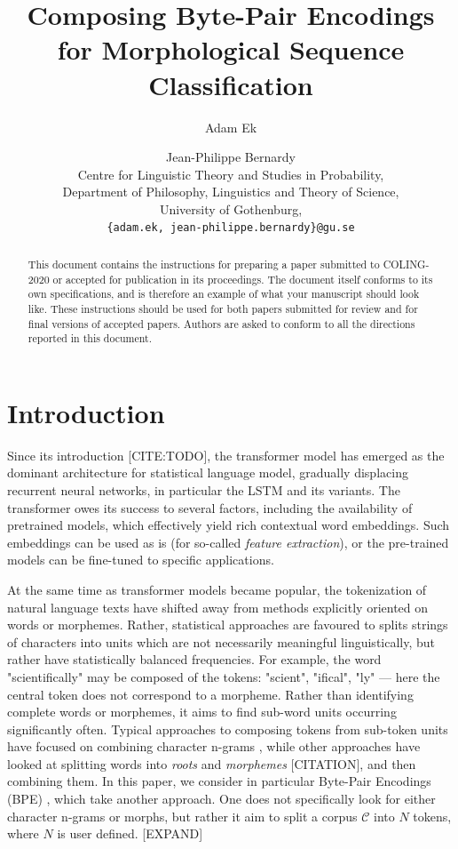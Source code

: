 \documentclass[11pt]{article}
\title{Composing Byte-Pair Encodings for Morphological Sequence Classification}
\author{Adam Ek \and Jean-Philippe Bernardy\\
	Centre for Linguistic Theory and Studies in Probability,\\
	Department of Philosophy, Linguistics and Theory of Science,\\
	University of Gothenburg,\\
	\texttt{\{adam.ek, jean-philippe.bernardy\}@gu.se}}
\date{}
\begin{document}
	\maketitle
	
	\begin{abstract}
		This document contains the instructions for preparing a paper submitted
		to COLING-2020 or accepted for publication in its proceedings. The document itself
		conforms to its own specifications, and is therefore an example of
		what your manuscript should look like. These instructions should be
		used for both papers submitted for review and for final versions of
		accepted papers. Authors are asked to conform to all the directions
		reported in this document.
	\end{abstract}
	
	\section{Introduction}
	\label{intro}

            Since its introduction [CITE:TODO], the transformer model
     \cite{vaswani2017attention} has emerged as the dominant
     architecture for statistical language model, gradually displacing
     recurrent neural networks, in particular the LSTM and its
     variants. The transformer owes its success to several factors,
     including the availability of pretrained models, which
     effectively yield rich contextual word embeddings. Such
     embeddings can be used as is (for so-called \emph{feature extraction}),
     or the pre-trained models can be fine-tuned to specific
     applications.

    	At the same time as transformer models became popular, the
     tokenization of natural language texts have shifted away from
     methods explicitly oriented on words or morphemes. Rather,
     statistical approaches are favoured to splits strings of
     characters into units which are not necessarily meaningful
     linguistically, but rather have statistically balanced
     frequencies. For example, the word "scientifically" may be
     composed of the tokens: "scient", "ifical", "ly" --- here the
     central token does not correspond to a morpheme.
            Rather than identifying complete words or morphemes, it
     aims to find sub-word units occurring significantly
     often. Typical approaches to composing tokens from sub-token
     units have focused on combining character n-grams
     \cite{bojanowski2017enriching}, while other approaches have
     looked at splitting words into \textit{roots} and
     \textit{morphemes} [CITATION], and then combining them. In this paper, we
     consider in particular Byte-Pair Encodings (BPE)
     \cite{sennrich2015neural}, which take another approach. One does
     not specifically look for either character n-grams or morphs, but
     rather it aim to split a corpus $\mathcal{C}$ into $N$ tokens,
     where $N$ is user defined. [EXPAND]
\end{document}
